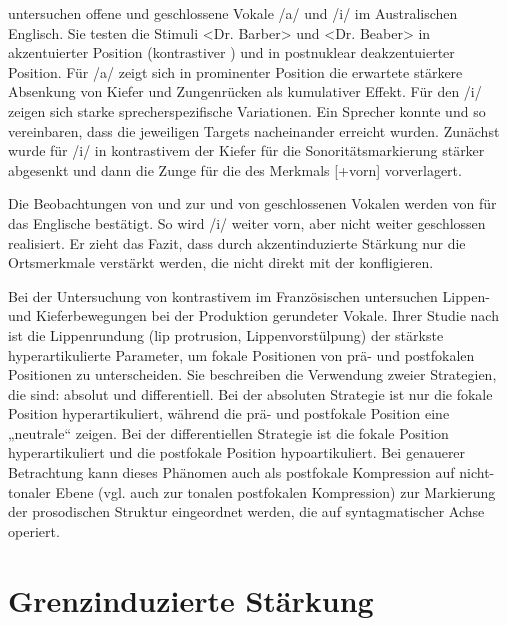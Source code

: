 \citet{Harrington2000} untersuchen offene und geschlossene Vokale /a/ und /i/ im Australischen Englisch. Sie testen die Stimuli <Dr. Barber> und <Dr. Beaber> in  akzentuierter Position (kontrastiver ) und in postnuklear deakzentuierter Position. Für /a/ zeigt sich in prominenter Position die erwartete stärkere Absenkung von Kiefer und Zungenrücken als kumulativer Effekt. Für den  /i/ zeigen sich starke sprecherspezifische Variationen. Ein Sprecher konnte  und  so vereinbaren, dass die jeweiligen Targets nacheinander erreicht wurden. Zunächst wurde für /i/ in kontrastivem  der Kiefer für die Sonoritätsmarkierung stärker abgesenkt und dann die Zunge für die  des Merkmals [+vorn] vorverlagert.

Die Beobachtungen von \citet{DeJong1993} und \citet{Harrington2000} zur  und  von geschlossenen Vokalen werden von \citet{Cho2005a} für das Englische bestätigt. So wird /i/ weiter vorn, aber nicht weiter geschlossen realisiert. Er zieht das Fazit, dass durch akzentinduzierte Stärkung nur die Ortsmerkmale verstärkt werden, die nicht direkt mit der  konfligieren.

Bei der Untersuchung von kontrastivem  im Französischen untersuchen \citet{Dohen2006} Lippen- und Kieferbewegungen bei der Produktion gerundeter Vokale. Ihrer Studie nach ist die Lippenrundung (lip protrusion, Lippenvorstülpung) der stärkste hyperartikulierte Parameter, um fokale Positionen von prä- und postfokalen Positionen zu unterscheiden. Sie beschreiben die Verwendung zweier Strategien, die  sind: absolut und differentiell. Bei der absoluten Strategie ist nur die fokale Position hyperartikuliert, während die prä- und postfokale Position eine „neutrale“  zeigen. Bei der differentiellen Strategie ist die fokale Position hyperartikuliert und die postfokale Position hypoartikuliert. Bei genauerer Betrachtung kann dieses Phänomen auch als postfokale Kompression auf nicht-tonaler Ebene (vgl. auch \citealt{Xu2011} zur tonalen postfokalen Kompression) zur Markierung der prosodischen Struktur eingeordnet werden, die auf syntagmatischer Achse operiert. 

\section{Grenzinduzierte Stärkung}
\label{sec:0502}

